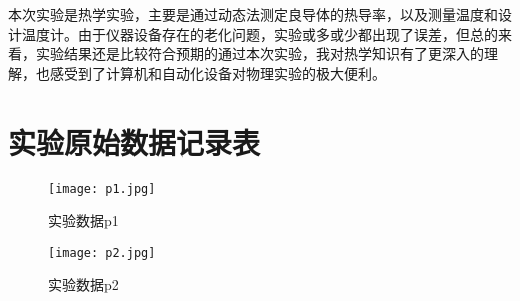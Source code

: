 \documentclass[11pt]{article}
\begin{document}
本次实验是热学实验，主要是通过动态法测定良导体的热导率，以及测量温度和设计温度计。由于仪器设备存在的老化问题，实验或多或少都出现了误差，但总的来看，实验结果还是比较符合预期的通过本次实验，我对热学知识有了更深入的理解，也感受到了计算机和自动化设备对物理实验的极大便利。

\section{实验原始数据记录表}

\begin{figure}[H]
  \centering
  \texttt{[image: p1.jpg]}
  \caption{实验数据p1}
\end{figure}

\begin{figure}[H]
  \centering
  \texttt{[image: p2.jpg]}
  \caption{实验数据p2}
\end{figure}
\end{document}
